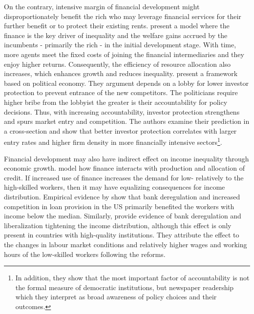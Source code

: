 \begin{refsection}
On the contrary, intensive margin of financial development might disproportionately benefit the rich who may leverage financial services for their further benefit or to protect their existing rents. \textcite{GreenwoodJovanovic1990} present a model where the finance is the key driver of inequality and the welfare gains accrued by the incumbents - primarily the rich - in the initial development stage. With time, more agents meet the fixed costs of joining the financial intermediaries and they enjoy higher returns. Consequently, the efficiency of resource allocation also increases, which enhances growth and reduces inequality. \textcite{perotti2007investor} present a framework based on political economy. They argument depends on a lobby for lower investor protection to prevent entrance of the new competitors. The politicians require higher bribe from the lobbyist the greater is their accountability for policy decisions. Thus, with increasing accountability, investor protection strengthens and spurs market entry and competition. The authors examine their prediction in a cross-section and show that better investor protection correlates with larger entry rates and higher firm density in more financially intensive sectors\footnote{In addition, they show that the most important factor of accountability is not the formal measure of democratic institutions, but newspaper readership which they interpret as broad awareness of policy choices and their outcomes.}. 

Financial development may also have indirect effect on income inequality through economic growth. \textcite{townsendeueda2006} model how finance interacts with production and allocation of credit. If increased use of finance increases the demand for low- relatively to the high-skilled workers, then it may have equalizing consequences for income distribution. Empirical evidence by \textcite{beck2010big} show that bank deregulation and increased competition in loan provision in the \ac{US} primarily benefited the workers with income below the median. Similarly, \textcite{delis2014} provide evidence of bank deregulation and liberalization tightening the income distribution, although this effect is only present in countries with high-quality institutions. They attribute the effect to the changes in labour market conditions and relatively higher wages and working hours of the low-skilled workers following the reforms. 


\end{refsection}
